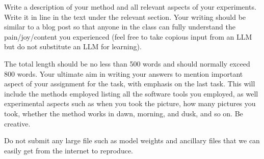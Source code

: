 Write a description of your method and all relevant aspects of your
experiments. Write it in line in the text under the relevant section.  Your writing should be similar to  a blog post so that anyone in the class can fully understand the pain/joy/content you experienced (feel free to take copious input from an LLM but do not substitute an LLM for learning).

The total length should be no less than 500 words and
should normally exceed 800 words.  Your ultimate aim in writing your answers
to mention important aspect of your assignment for the task, with
emphasis on the last task.  This will include the methods employed
listing all the software tools you employed, as well experimental
aspects such as when you took the picture, how many pictures 
you took, whether the method works in dawn, morning, and dusk, and so
on. Be creative.  

Do not submit any large file such as
model weights and ancillary files that we can easily get from the
internet to reproduce.
